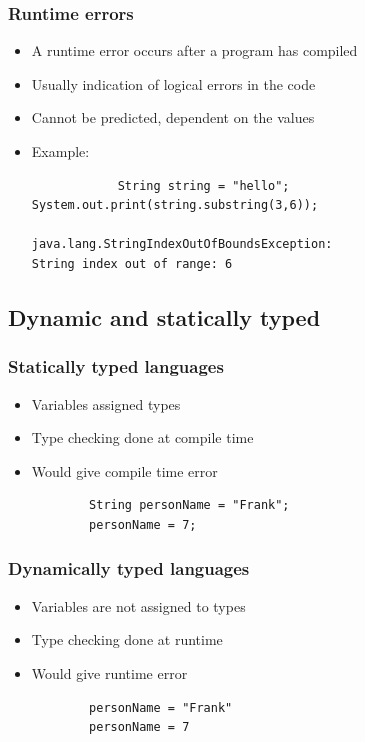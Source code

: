 \documentclass{beamer}
\begin{document}
\begin{frame}[fragile]
	\frametitle{Runtime errors}
		\begin{itemize}
			\item A runtime error occurs after a program has compiled
			\item Usually indication of logical errors in the code
			\item Cannot be predicted, dependent on the values
			\item Example:
			\begin{verbatim}
			String string = "hello";
System.out.print(string.substring(3,6));

java.lang.StringIndexOutOfBoundsException:
String index out of range: 6
			\end{verbatim}
		\end{itemize}
\end{frame}

\subsection{Dynamic and statically typed}

\begin{frame}[fragile]
  \frametitle{Statically typed languages}
	\begin{itemize}
		\item Variables assigned types
		\item Type checking done at compile time
		\item Would give compile time error
		\begin{verbatim}
		String personName = "Frank";
		personName = 7;
		\end{verbatim}
	\end{itemize}
\end{frame}

\begin{frame}[fragile]
  \frametitle{Dynamically typed languages}
	\begin{itemize}
		\item Variables are not assigned to types
		\item Type checking done at runtime
		\item Would give runtime error
		\begin{verbatim}
		personName = "Frank"
		personName = 7
		\end{verbatim}
	\end{itemize}
\end{frame}
\end{document}
